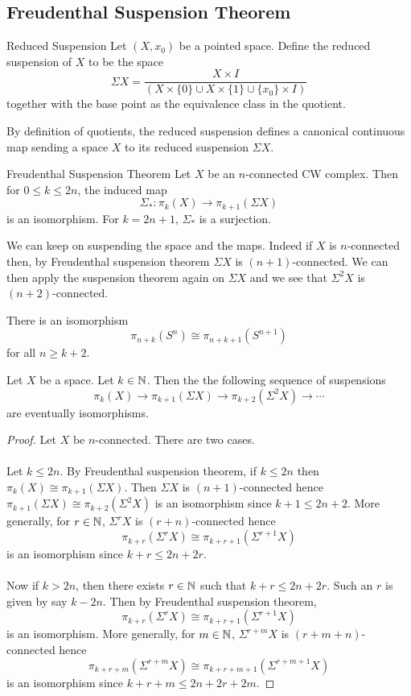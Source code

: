 \documentclass[a4paper]{article}
\begin{document}
\subsection{Freudenthal Suspension Theorem}
\begin{defn}{Reduced Suspension}{} Let $(X,x_0)$ be a pointed space. Define the reduced suspension of $X$ to be the space $$\Sigma X=\frac{X\times I}{(X\times\{0\}\cup X\times\{1\}\cup\{x_0\}\times I)}$$ together with the base point as the equivalence class in the quotient. 
\end{defn}

By definition of quotients, the reduced suspension defines a canonical continuous map sending a space $X$ to its reduced suspension $\Sigma X$. 

\begin{thm}{Freudenthal Suspension Theorem}{} Let $X$ be an $n$-connected CW complex. Then for $0\leq k\leq 2n$, the induced map $$\Sigma_\ast:\pi_k(X)\to\pi_{k+1}(\Sigma X)$$ is an isomorphism. For $k=2n+1$, $\Sigma_\ast$ is a surjection. 
\end{thm}

We can keep on suspending the space and the maps. Indeed if $X$ is $n$-connected then, by Freudenthal suspension theorem $\Sigma X$ is $(n+1)$-connected. We can then apply the suspension theorem again on $\Sigma X$ and we see that $\Sigma^2X$ is $(n+2)$-connected. 

\begin{crl}{}{} There is an isomorphism $$\pi_{n+k}(S^n)\cong\pi_{n+k+1}(S^{n+1})$$ for all $n\geq k+2$. 
\end{crl}

\begin{prp}{}{} Let $X$ be a space. Let $k\in\mathbb{N}$. Then the the following sequence of suspensions $$\pi_k(X)\to\pi_{k+1}(\Sigma X)\to\pi_{k+2}(\Sigma^2X)\to\cdots$$ are eventually isomorphisms. \tcbline
\begin{proof}
Let $X$ be $n$-connected. There are two cases. \\~\\

Let $k\leq 2n$. By Freudenthal suspension theorem, if $k\leq 2n$ then $\pi_k(X)\cong\pi_{k+1}(\Sigma X)$. Then $\Sigma X$ is $(n+1)$-connected hence $\pi_{k+1}(\Sigma X)\cong\pi_{k+2}(\Sigma^2X)$ is an isomorphism since $k+1\leq 2n+2$. More generally, for $r\in\mathbb{N}$, $\Sigma^rX$ is $(r+n)$-connected hence $$\pi_{k+r}(\Sigma^rX)\cong\pi_{k+r+1}(\Sigma^{r+1}X)$$ is an isomorphism since $k+r\leq 2n+2r$. \\~\\

Now if $k>2n$, then there exists $r\in\mathbb{N}$ such that $k+r\leq 2n+2r$. Such an $r$ is given by say $k-2n$. Then by Freudenthal suspension theorem, $$\pi_{k+r}(\Sigma^rX)\cong\pi_{k+r+1}(\Sigma^{r+1}X)$$ is an isomorphism. More generally, for $m\in\mathbb{N}$, $\Sigma^{r+m}X$ is $(r+m+n)$-connected hence $$\pi_{k+r+m}(\Sigma^{r+m}X)\cong\pi_{k+r+m+1}(\Sigma^{r+m+1}X)$$ is an isomorphism since $k+r+m\leq 2n+2r+2m$. 
\end{proof}
\end{prp}
\end{document}
